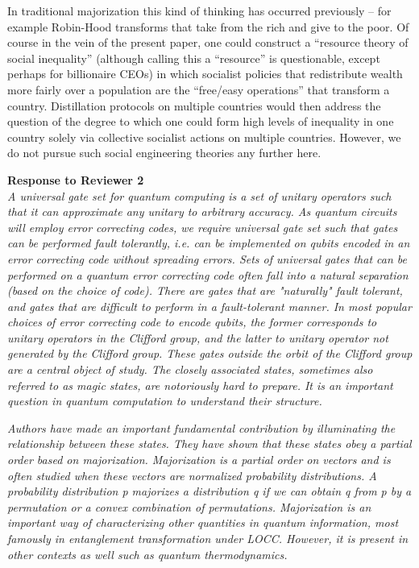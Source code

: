 \documentclass[11pt]{letter}
\begin{document}
In traditional majorization this kind of thinking has occurred previously -- for example Robin-Hood transforms that take from the rich and give to the poor. Of course in the vein of the present paper,  one could construct a ``resource theory of social inequality'' (although calling this a ``resource'' is questionable,  except perhaps for billionaire CEOs) in which socialist policies that redistribute wealth more fairly over a population are the ``free/easy operations'' that transform a country.  Distillation protocols on multiple countries would then address the question of the degree to which one could form high levels of inequality in one country solely via collective socialist actions on multiple countries.  However, we do not pursue such social engineering theories any further here.

\textbf{\large{Response to Reviewer 2}}\\

\textit{A universal gate set for quantum computing is a set of unitary operators such that it can approximate any unitary to arbitrary accuracy. As quantum circuits will employ error correcting codes, we require universal gate set such that gates can be performed fault tolerantly, i.e. can be implemented on qubits encoded in an error correcting code without spreading errors. Sets of universal gates that can be performed on a quantum error correcting code often fall into a natural separation (based on the choice of code). There are gates that are "naturally" fault tolerant, and gates that are difficult to perform in a fault-tolerant manner. In most popular choices of error correcting code to encode qubits, the former corresponds to unitary operators in the Clifford group, and the latter to unitary operator not generated by the Clifford group. These gates outside the orbit of the Clifford group are a central object of study. The closely associated states, sometimes also referred to as magic
states, are notoriously hard to prepare. It is an important question in quantum computation to understand their structure.}

\textit{Authors have made an important fundamental contribution by illuminating the relationship between these states. They have shown that these states obey a partial order based on majorization. Majorization is a partial order on vectors and is often studied when these vectors are normalized probability distributions. A probability distribution p majorizes a distribution q if we can obtain q from p by a permutation or a convex combination of permutations. Majorization is an important way of characterizing other quantities in quantum information, most famously in entanglement transformation under LOCC. However, it is present in other contexts as well such as quantum thermodynamics.}
\end{document}
